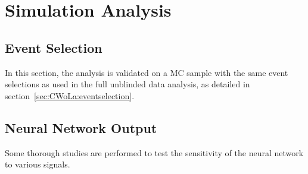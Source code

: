 


\clearpage
\section{Simulation Analysis}
\label{sec:CWoLa:simulation_analysis}
\subsection{Event Selection}
In this section, the analysis is validated on a MC sample with the same event selections as used in the full unblinded data analysis, as detailed in section~\ref{sec:CWoLa:eventselection}.

\subsection{Neural Network Output}
\label{sec:CWoLa:simulation:NN}

Some thorough studies are performed to test the sensitivity of the neural network to various signals.

